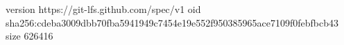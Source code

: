 version https://git-lfs.github.com/spec/v1
oid sha256:cdeba3009dbb70fba5941949c7454e19e552f950385965ace7109f0febfbcb43
size 626416
